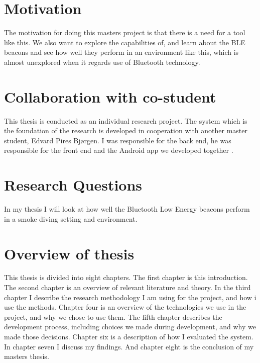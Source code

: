 \documentclass[../Main/thesis.tex]{subfiles}
\begin{document}
\section{Motivation}
The motivation for doing this masters project is that there is a need for a tool like this.
We also want to explore the capabilities of, and learn about the BLE beacons and see how well they perform in an environment like this, which is almost unexplored when it regards use of Bluetooth technology. 

\section{Collaboration with co-student}
This thesis is conducted as an individual research project.
The system which is the foundation of the research is developed in cooperation with another master student, Edvard Pires Bjørgen.
I was responsible for the back end, he was responsible for the front end and the Android app we developed together \citep{Bjorgen2018}. 

\section{Research Questions}
In my thesis I will look at how well the Bluetooth Low Energy beacons perform in a smoke diving setting and environment. 


\section{Overview of thesis}
This thesis is divided into eight chapters.
The first chapter is this introduction.
The second chapter is an overview of relevant literature and theory.
In the third chapter I describe the research methodology I am using for the project, and how i use the methods.
Chapter four is an overview of the technologies we use in the project, and why we chose to use them.
The fifth chapter describes the development process, including choices we made during development, and why we made those decisions.
Chapter six is a description of how I evaluated the system.
In chapter seven I discuss my findings.
And chapter eight is the conclusion of my masters thesis.


\onlyinsubfile{}
\onlyinsubfile{}
\end{document}
